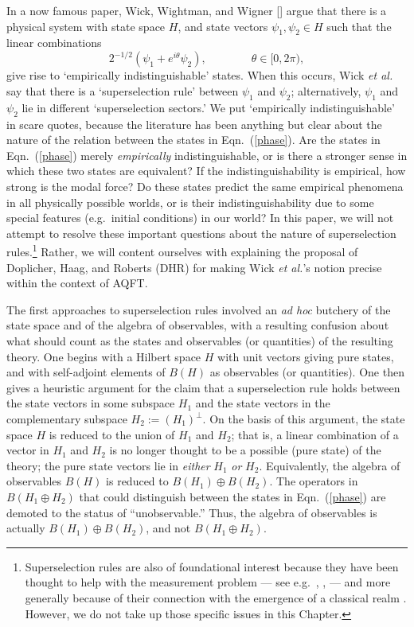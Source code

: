 \documentclass[12pt]{article}
\theoremstyle{definition}
\theoremstyle{definition}
\theoremstyle{remark}
\newcommand{\et}{\textit{et al.} }
\begin{document}
In a now famous paper, Wick, Wightman, and Wigner
[\citeyear{www}] argue that there is a physical system
with state space $H$, and state vectors $\psi _1,\psi
_2 \in H$ such that the linear combinations
\begin{equation} 2^{-1/2}(\psi _1+e^{i\theta }\psi _2 ), \qquad \qquad
  \theta \in [0,2\pi ) , \label{phase} \end{equation} give rise to
`empirically indistinguishable' states.  When this occurs, Wick \et
say that there is a `superselection rule' between $\psi _1$ and $\psi
_2$; alternatively, $\psi _1$ and $\psi _2$ lie in different
`superselection sectors.'  We put `empirically indistinguishable' in
scare quotes, because the literature has been anything but clear about
the nature of the relation between the states in Eqn.\ (\ref{phase}).
Are the states in Eqn.\ (\ref{phase}) merely \emph{empirically}
indistinguishable, or is there a stronger sense in which these two
states are equivalent?  If the indistinguishability is empirical, how
strong is the modal force?  Do these states predict the same empirical
phenomena in all physically possible worlds, or is their
indistinguishability due to some special features (e.g.\ initial
conditions) in our world?  In this paper, we will not attempt to
resolve these important questions about the nature of superselection
rules.\footnote{Superselection rules are also of foundational interest
  because they have been thought to help with the measurement problem
  --- see e.g.\ \cite[p.\ 74]{belt}, \cite{klaas}, \cite[pp.\
  264--272]{bas} --- and more generally because of their connection
  with the emergence of a classical realm \cite{giul}.  However, we do
  not take up those specific issues in this Chapter.}  Rather, we will
content ourselves with explaining the proposal of Doplicher, Haag, and
Roberts (DHR) for making Wick \textit{et al.}'s notion precise within
the context of AQFT.

The first approaches to superselection rules involved
an \textit{ad hoc} butchery of the state space and of
the algebra of observables, with a resulting confusion
about what should count as the states and observables
(or quantities) of the resulting theory.  One begins
with a Hilbert space $H$ with unit vectors giving pure
states, and with self-adjoint elements of $B(H)$ as
observables (or quantities).  One then gives a
heuristic argument for the claim that a superselection
rule holds between the state vectors in some subspace
$H _1$ and the state vectors in the complementary
subspace $H_2:=(H _1)^{\perp}$.  On the basis of this
argument, the state space $H$ is reduced to the union
of $H_1$ and $H_2$; that is, a linear combination of a
vector in $H _1$ and $H _2$ is no longer thought to be
a possible (pure state) of the theory; the pure state
vectors lie in \emph{either} $H_1$ \emph{or} $H _2$.
Equivalently, the algebra of observables $B(H)$ is
reduced to $B(H _1)\oplus B(H _2)$.  The operators in
$B(H_1\oplus H_2)$ that could distinguish between the
states in Eqn.\ (\ref{phase}) are demoted to the status
of ``unobservable.''  Thus, the algebra of observables
is actually $B(H _1)\oplus B(H _2)$, and not
$B(H_1\oplus H_2)$.
\end{document}
